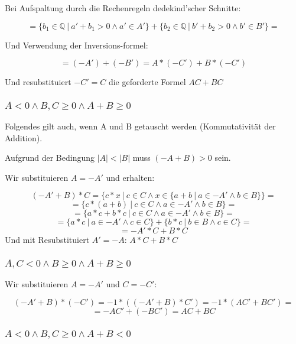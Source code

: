 \documentclass[12pt]{article}
\begin{document}
    Bei Aufspaltung durch die Rechenregeln dedekind'scher Schnitte:

    \[
        = \{b_1 \in \mathbb{Q} \mspace{4mu} | \mspace{4mu} a' + b_1 > 0 \land a' \in A'\} + \{b_2 \in \mathbb{Q} \mspace{4mu} | \mspace{4mu} b' + b_2 > 0 \land b' \in B'\} =
    \]

    Und Verwendung der Inversions-formel:

    \[
        = (-A') + (-B') = A*(-C') + B * (-C')
    \]

    Und resubstituiert $-C' = C$ die geforderte Formel $AC + BC$

    \subsubsection{$A < 0 \land B, C \ge 0 \land A + B \ge 0$}

    Folgendes gilt auch, wenn A und B getauscht werden (Kommutativität der Addition).

    Aufgrund der Bedingung $|A| < |B|$ muss $(-A + B) > 0$ sein.

    Wir substituieren $A = -A'$ und erhalten:

    \[
        (-A' + B) * C = \{c * x \mspace{4mu} | \mspace{4mu} c \in C \land x \in \{a + b \mspace{4mu} | \mspace{4mu} a \in -A' \land b \in B\}\} =
    \]
    \[
        = \{c * (a + b) \mspace{4mu} | \mspace{4mu} c \in C \land a \in -A' \land b \in B\} =
    \]
    \[
        = \{a*c + b*c \mspace{4mu} | \mspace{4mu} c \in C \land a \in -A' \land b \in B\} =
    \]
    \[
        = \{a*c \mspace{4mu} | \mspace{4mu} a \in -A' \land c \in C\} + \{b * c \mspace{4mu} | \mspace{4mu} b \in B \land c \in C\} =
    \]
    \[
        = -A' * C + B * C
    \]
    Und mit Resubstituiert $A' = -A$: $A * C + B * C$

    \subsubsection{$A, C < 0 \land B \ge 0 \land A + B \ge 0$}

    Wir substituieren $A = -A'$ und $C = -C'$:

    \[
        (-A' + B) * (-C') = -1 * ((-A' + B) * C') = -1 * (AC' + BC') =
    \]
    \[
        = -AC' + (-BC') = AC + BC
    \]

    \subsubsection{$A < 0 \land B, C \ge 0 \land A + B < 0$}
\end{document}
